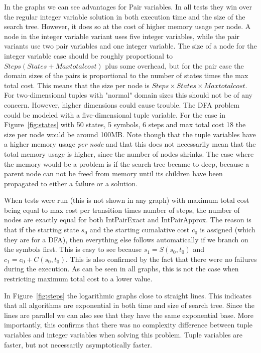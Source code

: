 \documentclass[a4paper,11pt]{article}
\begin{document}
In the graphs we can see advantages for Pair variables. In all tests they win over the regular integer variable solution in both execution time and the size of the search tree. However, it does so at the cost of higher memory usage per node. A node in the integer variable variant uses five integer variables, while the pair variants use two pair variables and one integer variable. The size of a node for the integer variable case should be roughly proportional to $Steps(States + Maxtotalcost)$ plus some overhead, but for the pair case the domain sizes of the pairs is proportional to the number of states times the max total cost. This means that the size per node is $Steps\times States\times Maxtotalcost$. For two-dimensional tuples with "normal" domain sizes this should not be of any concern. However, higher dimensions could cause trouble. The DFA problem could be modeled with a five-dimensional tuple variable. For the case in Figure~\ref{fig:states} with 50 states, 5 symbols, 6 steps and max total cost 18 the size per node would be around 100MB. Note though that the tuple variables have a higher memory usage \textit{per node} and that this does not necessarily mean that the total memory usage is higher, since the number of nodes shrinks. The case where the memory would be a problem is if the search tree became to deep, because a parent node can not be freed from memory until its children have been propagated to either a failure or a solution.

When tests were run (this is not shown in any graph) with maximum total cost being equal to max cost per transition times number of steps, the number of nodes are exactly equal for both IntPairExact and IntPairApprox. The reason is that if the starting state $s_0$ and the starting cumalative cost $c_0$ is assigned (which they are for a DFA), then everything else follows automatically if we branch on the symbols first. This is easy to see because $s_1=S(s_0, t_0)$ and $c_1=c_0+C(s_0, t_0)$. This is also confirmed by the fact that there were no failures during the execution. As can be seen in all graphs, this is not the case when restricting maximum total cost to a lower value.

In Figure~\ref{fig:steps} the logarithmic graphs  close to straight lines. This indicates that all algorithms are exponential in both time and size of search tree. Since the lines are parallel we can also see that they have the same exponential base. More importantly, this confirms that there was no complexity difference between tuple variables and integer variables when solving this problem. Tuple variables are faster, but not necessarily asymptotically faster. 
\end{document}
